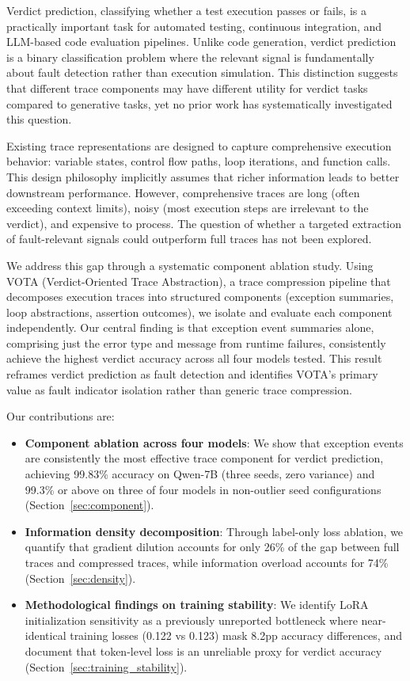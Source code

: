 \documentclass[11pt]{article}
\begin{document}
Verdict prediction, classifying whether a test execution passes or fails, is a practically important task for automated testing, continuous integration, and LLM-based code evaluation pipelines. Unlike code generation, verdict prediction is a binary classification problem where the relevant signal is fundamentally about fault detection rather than execution simulation. This distinction suggests that different trace components may have different utility for verdict tasks compared to generative tasks, yet no prior work has systematically investigated this question.

Existing trace representations are designed to capture comprehensive execution behavior: variable states, control flow paths, loop iterations, and function calls. This design philosophy implicitly assumes that richer information leads to better downstream performance. However, comprehensive traces are long (often exceeding context limits), noisy (most execution steps are irrelevant to the verdict), and expensive to process. The question of whether a targeted extraction of fault-relevant signals could outperform full traces has not been explored.

We address this gap through a systematic component ablation study. Using VOTA (Verdict-Oriented Trace Abstraction), a trace compression pipeline that decomposes execution traces into structured components (exception summaries, loop abstractions, assertion outcomes), we isolate and evaluate each component independently. Our central finding is that exception event summaries alone, comprising just the error type and message from runtime failures, consistently achieve the highest verdict accuracy across all four models tested. This result reframes verdict prediction as fault detection and identifies VOTA's primary value as fault indicator isolation rather than generic trace compression.

Our contributions are:
\begin{itemize}
    \item \textbf{Component ablation across four models}: We show that exception events are consistently the most effective trace component for verdict prediction, achieving 99.83\% accuracy on Qwen-7B (three seeds, zero variance) and 99.3\% or above on three of four models in non-outlier seed configurations (Section~\ref{sec:component}).
    \item \textbf{Information density decomposition}: Through label-only loss ablation, we quantify that gradient dilution accounts for only 26\% of the gap between full traces and compressed traces, while information overload accounts for 74\% (Section~\ref{sec:density}).
    \item \textbf{Methodological findings on training stability}: We identify LoRA initialization sensitivity as a previously unreported bottleneck where near-identical training losses (0.122 vs 0.123) mask 8.2pp accuracy differences, and document that token-level loss is an unreliable proxy for verdict accuracy (Section~\ref{sec:training_stability}).
\end{itemize}
\end{document}
